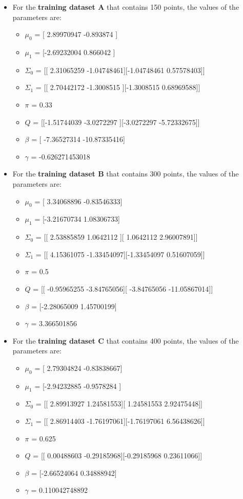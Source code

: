\documentclass[11pt]{article}
\numberwithin{figure}{section} %
\begin{document}
\begin{itemize}
\item For the \textbf{training dataset A} that contains 150 points, the values of the parameters are:
	\begin{itemize}
		\item $\mu_0$ = [ 2.89970947 -0.893874  ]
		\item $\mu_1$ = [-2.69232004  0.866042  ]
		\item $\Sigma_0$ = [[ 2.31065259 -1.04748461][-1.04748461  0.57578403]]
		\item $\Sigma_1$ = [[ 2.70442172 -1.3008515 ][-1.3008515   0.68969588]]
		\item $\pi$ = 0.33
		\item $Q$ = [[-1.51744039 -3.0272297 ][-3.0272297  -5.72332675]]
		\item $\beta$ = [ -7.36527314 -10.87335416]
		\item $\gamma$ = -0.626271453018
	\end{itemize}

\item For the \textbf{training dataset B} that contains 300 points, the values of the parameters are:
	\begin{itemize}
		\item $\mu_0$ = [ 3.34068896 -0.83546333]
		\item $\mu_1$ = [-3.21670734  1.08306733]
		\item $\Sigma_0$ = [[ 2.53885859  1.0642112 ][ 1.0642112   2.96007891]]
		\item $\Sigma_1$ = [[ 4.15361075 -1.33454097][-1.33454097  0.51607059]]
		\item $\pi$ = 0.5
		\item $Q$ = [[ -0.95965255  -3.84765056][ -3.84765056 -11.05867014]]
		\item $\beta$ = [-2.28065009  1.45700199]
		\item $\gamma$ = 3.366501856
	\end{itemize}

\item For the \textbf{training dataset C} that contains 400 points, the values of the parameters are:
	\begin{itemize}
		\item $\mu_0$ = [ 2.79304824 -0.83838667]
		\item $\mu_1$ = [-2.94232885 -0.9578284 ]
		\item $\Sigma_0$ = [[ 2.89913927  1.24581553][ 1.24581553  2.92475448]]
		\item $\Sigma_1$ = [[ 2.86914403 -1.76197061][-1.76197061  6.56438626]]
		\item $\pi$ = 0.625
		\item $Q$ = [[ 0.00488603 -0.29185968][-0.29185968  0.23611066]]
		\item $\beta$ = [-2.66524064  0.34888942]
		\item $\gamma$ = 0.110042748892
	\end{itemize}
\end{itemize}
\end{document}
